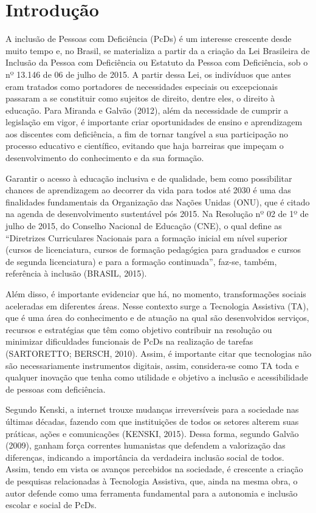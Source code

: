 \documentclass[preprint, 3p,
authoryear]{elsarticle} %
\begin{document}
\section{Introdução}\label{introduuxe7uxe3o}

A inclusão de Pessoas com Deficiência (PcDs) é um interesse crescente
desde muito tempo e, no Brasil, se materializa a partir da a criação da
Lei Brasileira de Inclusão da Pessoa com Deficiência ou Estatuto da
Pessoa com Deficiência, sob o nº 13.146 de 06 de julho de 2015. A partir
dessa Lei, os indivíduos que antes eram tratados como portadores de
necessidades especiais ou excepcionais passaram a se constituir como
sujeitos de direito, dentre eles, o direito à educação. Para Miranda e
Galvão (2012), além da necessidade de cumprir a legislação em vigor, é
importante criar oportunidades de ensino e aprendizagem aos discentes
com deficiência, a fim de tornar tangível a sua participação no processo
educativo e científico, evitando que haja barreiras que impeçam o
desenvolvimento do conhecimento e da sua formação.

Garantir o acesso à educação inclusiva e de qualidade, bem como
possibilitar chances de aprendizagem ao decorrer da vida para todos até
2030 é uma das finalidades fundamentais da Organização das Nações Unidas
(ONU), que é citado na agenda de desenvolvimento sustentável pós 2015.
Na Resolução nº 02 de 1º de julho de 2015, do Conselho Nacional de
Educação (CNE), o qual define as ``Diretrizes Curriculares Nacionais
para a formação inicial em nível superior (cursos de licenciatura,
cursos de formação pedagógica para graduados e cursos de segunda
licenciatura) e para a formação continuada'', faz-se, também, referência
à inclusão (BRASIL, 2015).

Além disso, é importante evidenciar que há, no momento, transformações
sociais aceleradas em diferentes áreas. Nesse contexto surge a
Tecnologia Assistiva (TA), que é uma área do conhecimento e de atuação
na qual são desenvolvidos serviços, recursos e estratégias que têm como
objetivo contribuir na resolução ou minimizar dificuldades funcionais de
PcDs na realização de tarefas (SARTORETTO; BERSCH, 2010). Assim, é
importante citar que tecnologias não são necessariamente instrumentos
digitais, assim, considera-se como TA toda e qualquer inovação que tenha
como utilidade e objetivo a inclusão e acessibilidade de pessoas com
deficiência.

Segundo Kenski, a internet trouxe mudanças irreversíveis para a
sociedade nas últimas décadas, fazendo com que instituições de todos os
setores alterem suas práticas, ações e comunicações (KENSKI, 2015).
Dessa forma, segundo Galvão (2009), ganham força correntes humanistas
que defendem a valorização das diferenças, indicando a importância da
verdadeira inclusão social de todos. Assim, tendo em vista os avanços
percebidos na sociedade, é crescente a criação de pesquisas relacionadas
à Tecnologia Assistiva, que, ainda na mesma obra, o autor defende como
uma ferramenta fundamental para a autonomia e inclusão escolar e social
de PcDs.
\end{document}
